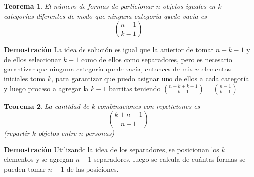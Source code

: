 \documentclass[a4paper,12pt]{report}
\newtheorem*{teo}{Teorema}
\begin{document}
\begin{teo}
    El número de formas de particionar $n$ objetos iguales en $k$ categorías diferentes de modo que ninguna categor\'ia quede vac\'ia es $$\binom{n-1}{k-1}$$
   \end{teo}
   
   \textbf{Demostración}
La idea de soluci\'on es igual que la anterior de tomar $n + k -1$ y de ellos seleccionar $k-1$ como de ellos como separadores, pero es necesario garantizar que ninguna categor\'ia quede vac\'ia, entonces de mis $n$ elementos iniciales tomo $k$, para garantizar que puedo asignar uno de ellos a cada categor\'ia y luego 
proceso a agregar la $k-1$ barritas teniendo  ${n - k + k-1}\choose{k-1}$$=$${n -1}\choose{k-1}$


\begin{teo}
   La cantidad de k-combinaciones con repeticiones es $$\binom{k+n-1}{n-1}$$ (repartir $k$ objetos entre $n$ personas)
\end{teo}

\textbf{Demostración}
Utilizando la idea de los separadores, se posicionan los $k$ elementos y se agregan $n -1$ separadores, luego se calcula de cu\'antas formas se pueden tomar $n-1$ de las posiciones.
\end{document}
